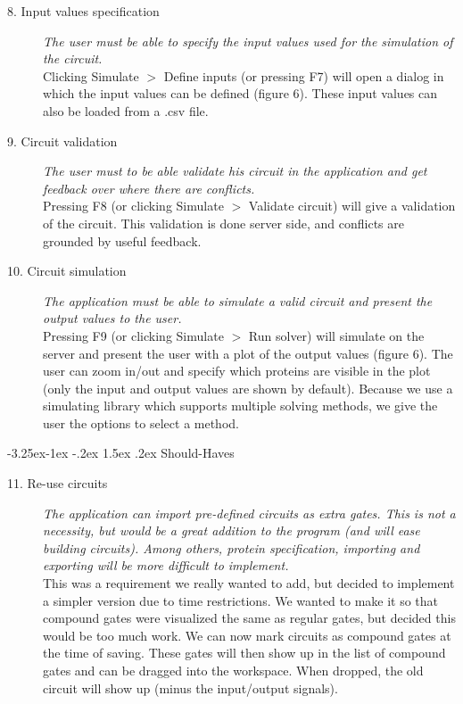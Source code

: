 \documentclass[a4paper]{article}
\makeatletter
\renewcommand\paragraph{\@startsection{paragraph}{4}{\z@}%
  {-3.25ex\@plus -1ex \@minus -.2ex}%
  {1.5ex \@plus .2ex}%
  {\normalfont\normalsize\bfseries}}
\makeatother
\begin{document}
\begin{description}
\item[8. Input values specification] \textit{The user must be able to specify the input values used for the simulation of the circuit.}\\
Clicking Simulate $>$ Define inputs (or pressing F7) will open a dialog in which the input values can be defined (figure 6). These input values can also be loaded from a .csv file.

\item[9. Circuit validation] \textit{The user must to be able validate his circuit in the application and get feedback over where there are conflicts.}\\
Pressing F8 (or clicking Simulate $>$ Validate circuit) will give a validation of the circuit. This validation is done server side, and conflicts are grounded by useful feedback.

\item[10. Circuit simulation] \textit{The application must be able to simulate a valid circuit and present the output values to the user.}\\
Pressing F9 (or clicking Simulate $>$ Run solver) will simulate on the server and present the user with a plot of the output values (figure 6). The user can zoom in/out and specify which proteins are visible in the plot (only the input and output values are shown by default). Because we use a simulating library which supports multiple solving methods, we give the user the options to select a method.
\end{description}

\paragraph{Should-Haves}
\begin{description}
\item[11. Re-use circuits] \textit{The application can import pre-defined circuits as extra gates. This is not a necessity, but would be a great addition to the program (and will ease building circuits). Among others, protein specification, importing and exporting will be more difficult to implement.}\\
This was a requirement we really wanted to add, but decided to implement a simpler version due to time restrictions. We wanted to make it so that compound gates were visualized the same as regular gates, but decided this would be too much work. We can now mark circuits as compound gates at the time of saving. These gates will then show up in the list of compound gates and can be dragged into the workspace. When dropped, the old circuit will show up (minus the input/output signals).
\end{description}
\end{document}
